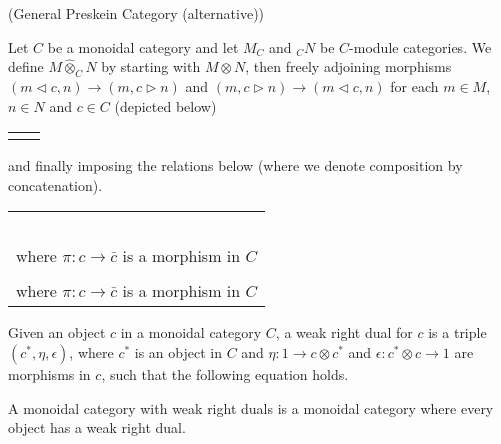\begin{definition} \label{pre-skein_no-duals_2} (General Preskein Category (alternative))
 
  \noindent Let $C$ be a monoidal category and let $M_C$ and $_{C}N$ be
  $C$-module categories. We define $M \hat{\otimes}_C N$ by starting with $M \otimes
  N$, then freely adjoining morphisms $(m\lhd c, n)\to (m,c\rhd n)$ and
  $(m,c\rhd n)\to (m\lhd c, n)$ for each $m\in M$, $n\in N$ and $c\in C$
  (depicted below)

  \begin{center}
    \begin{tabular}{ll}
     & 

    \end{tabular}
  \end{center}

  \noindent and finally imposing the relations below (where we denote composition by
  concatenation).

  \begin{center}
    \begin{tabular}{l}

     \\ \\
     \\ \\
     \\ \\
     where $\pi:c\to\bar{c}$ is a morphism in $C$ \\ \\
     where $\pi:c\to\bar{c}$ is a morphism in $C$
  \end{tabular}
\end{center}

\end{definition}

\begin{definition} \label{definition/weak-right-dual}
 
  \noindent Given an object $c$ in a monoidal category $C$, a weak right dual
  for $c$ is a triple $(c^*,\eta,\epsilon)$, where $c^*$ is an object in $C$
  and $\eta:1\to c\otimes c^*$ and $\epsilon:c^*\otimes c\to 1$ are morphisms
  in $c$, such that the following equation holds.

  \begin{center}
    
  \end{center}

  A monoidal category with weak right duals is a monoidal category where every
  object has a weak right dual.
\end{definition}

